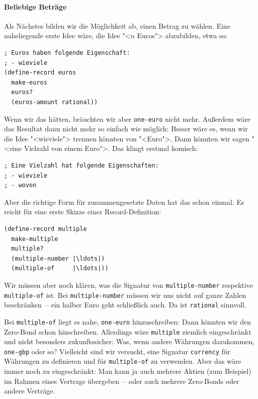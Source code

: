 \paragraph{Beliebige Beträge}
Als Nächstes bilden wir die Möglichkeit ab, einen Betrag zu wählen.
Eine naheliegende erste Idee wäre, die Idee "<$n$ Euros"> abzubilden,
etwa so:
%
\begin{lstlisting}
; Euros haben folgende Eigenschaft:
; - wieviele
(define-record euros
  make-euros
  euros?
  (euros-amount rational))
\end{lstlisting}
%
Wenn wir das hätten, bräuchten wir aber \lstinline{one-euro} nicht mehr.
Außerdem wäre das Resultat dann nicht mehr so einfach wie möglich:
Besser wäre es, wenn wir die Idee "<wieviele"> trennen könnten von
"<Euro">.  Dann könnten wir sagen "<eine Vielzahl von einem Euro">.  Das
klingt erstmal komisch: %
%
\begin{lstlisting}
; Eine Vielzahl hat folgende Eigenschaften:
; - wieviele
; - wovon
\end{lstlisting}
%
Aber die richtige Form für zusammengesetzte Daten hat das schon
einmal.  Es reicht für eine erste Skizze einer Record-Definition:
%
\begin{lstlisting}
(define-record multiple
  make-multiple
  multiple?
  (multiple-number |\ldots|)
  (multiple-of     |\ldots|))
\end{lstlisting}
%
Wir müssen aber noch klären, was die Signatur von
\lstinline{multiple-number} respektive \lstinline{multiple-of} ist.
Bei \lstinline{multiple-number} müssen wir uns nicht auf ganze Zahlen
beschränken~-- ein halber Euro geht schließlich auch.  Da ist
\lstinline{rational} sinnvoll.

Bei \lstinline{multiple-of} liegt es nahe, \lstinline{one-euro}
hinzuschreiben: Dann könnten wir den Zero-Bond schon hinschreiben.
Allerdings wäre \lstinline{multiple} ziemlich eingeschränkt und nicht
besonders zukunftssicher: Was, wenn andere Währungen dazukommen,
\lstinline{one-gbp} oder so?  Vielleicht sind wir versucht, eine
Signatur \lstinline{currency} für Währungen zu definieren und für
\lstinline{multiple-of} zu verwenden.  Aber das wäre immer noch zu
eingeschränkt: Man kann ja auch mehrere Aktien (zum Beispiel) im
Rahmen eines Vertrags übergeben~-- oder auch mehrere Zero-Bonds oder
andere Verträge.

